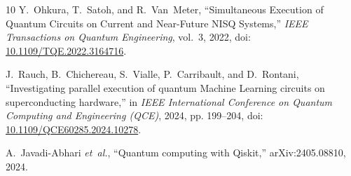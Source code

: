 \documentclass[10pt,conference]{IEEEtran}
\newif\ifshowrefs
\begin{document}
\begin{thebibliography}{10}
Y.~Ohkura, T.~Satoh, and R.~Van~Meter, ``{Simultaneous Execution of Quantum
  Circuits on Current and Near-Future NISQ Systems},'' \emph{IEEE Transactions
  on Quantum Engineering}, vol.~3, 2022, doi:
  \href{https://doi.org/10.1109/TQE.2022.3164716}{10.1109/TQE.2022.3164716}.

J.~Rauch, B.~Chichereau, S.~Vialle, P.~Carribault, and D.~Rontani,
  ``{Investigating parallel execution of quantum Machine Learning circuits on
  superconducting hardware},'' in \emph{IEEE International Conference on
  Quantum Computing and Engineering (QCE)}, 2024, pp. 199--204, doi:
  \href{https://doi.org/10.1109/QCE60285.2024.10278}{10.1109/QCE60285.2024.10278}.

A.~Javadi-Abhari \emph{et~al.}, ``{Quantum computing with Qiskit},''
  arXiv:2405.08810, 2024.

\end{thebibliography}
\ifshowrefs\else\egroup\fi
\end{document}
